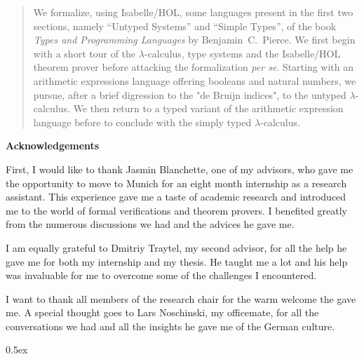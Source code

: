 \documentclass[12pt,a4paper,titlepage,oneside]{article}
\makeatletter
\newcommand\ackname{Acknowledgements}
\newenvironment{acknowledgements}{%
      \titlepage
      \null\vfil
      \@beginparpenalty\@lowpenalty
      \begin{center}%
        \bfseries \ackname
        \@endparpenalty\@M
      \end{center}}%
     {\par\vfil\null\endtitlepage}
\newenvironment{acknowledgements}{%
      \if@twocolumn
        \section*{\abstractname}%
      \else
        \small
        \begin{center}%
          {\bfseries \ackname\vspace{-.5em}\vspace{\z@}}%
        \end{center}%
        \quotation
      \fi}
      {\if@twocolumn\else\endquotation\fi}
\makeatother
\begin{document}
\begin{abstract}
We formalize, using Isabelle/HOL, some languages present in the first two sections, namely ``Untyped
Systems'' and ``Simple Types'', of the book \emph{Types and Programming Languages} by
Benjamin~C.~Pierce. We first begin with a short tour of the $\lambda$-calculus, type systems and the
Isabelle/HOL theorem prover before attacking the formalization \emph{per se}. Starting with an
arithmetic expressions language offering booleans and natural numbers, we pursue, after a brief
digression to the "de Bruijn indices", to the untyped $\lambda$-calculus. We then return to a typed
variant of the arithmetic expression language before to conclude with the simply typed
$\lambda$-calculus.
\end{abstract}

\newpage
\null
\newpage

\begin{acknowledgements}
  First, I would like to thank Jasmin Blanchette, one of my advisors, who gave me the opportunity to
  move to Munich for an eight month internship as a research assistant. This experience gave me a
  taste of academic research and introduced me to the world of formal verifications and theorem
  provers. I benefited greatly from the numerous discussions we had and the advices he gave me.

  I am equally grateful to Dmitriy Traytel, my second advisor, for all the help he gave me for
  both my internship and my thesis. He taught me a lot and his help was invaluable for me to
  overcome some of the challenges I encountered.

  I want to thank all members of the research chair for the warm welcome the gave me. A special
  thought goes to Lars Noschinski, my officemate, for all the conversations we had and all the
  insights he gave me of the German culture.
\end{acknowledgements}

\newpage
\null
\newpage

\tableofcontents

\newpage
\null
\newpage

\pagestyle{headings}





\parindent 0pt\parskip 0.5ex










\nocite{*}



%
%
\end{document}
